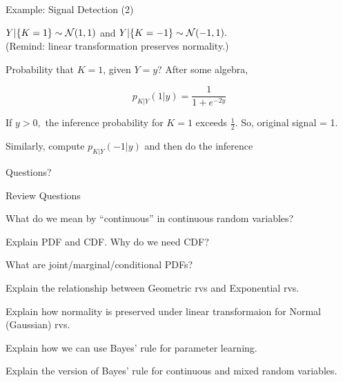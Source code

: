 \begin{frame}{Example: Signal Detection (2)}

\plitemsep 0.01in
\bci

\item<1-> $Y|\{K=1\} \sim \mathcal N(1,1)$ and $Y|\{K=-1\} \sim \mathcal N(-1,1).$ \\
(Remind: linear transformation preserves normality.)

\item<4-> Probability that $K=1$, given $Y=y$? After some algebra,

{
$$
p_{K|Y}(1|y) = \frac{1}{1+ e^{-2y}}
$$
\vspace{-0.3cm}
\bci
\item<6->  If $y >0,$ the inference probability for $K=1$ exceeds $\frac{1}{2}$. So, original signal = 1.
\item<7->  Similarly, compute $p_{K|Y}(-1|y)$ and then do the inference
\eci


}
{
\centering
{}
}

\eci

\end{frame}

\begin{frame}{}
\vspace{2cm}
\LARGE Questions?

\end{frame}

\begin{frame}{Review Questions}


\plitemsep 0.1in

\bce[1)]
\item What do we mean by ``continuous'' in continuous random variables?

\item Explain PDF  and CDF. Why do we need CDF?

\item What are joint/marginal/conditional PDFs?

\item Explain the relationship between Geometric rvs and Exponential
  rvs. 

\item Explain how normality is preserved under linear transformaion
  for Normal (Gaussian) rvs. 
  
\item Explain how we can use Bayes' rule for parameter learning. 

\item Explain the version of Bayes' rule for continuous
  and mixed random variables.


\ece

\end{frame}


